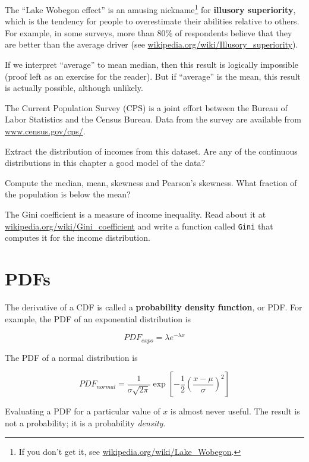 \documentclass[12pt]{book}
\begin{document}
\begin{ex}

The ``Lake Wobegon effect'' is an amusing nickname\footnote{If you
  don't get it, see \url{wikipedia.org/wiki/Lake_Wobegon}.} for {\bf
  illusory superiority}, which is the tendency for people to
overestimate their abilities relative to others.  For example, in some
surveys, more than 80\% of respondents believe that they are better
than the average driver (see
  \url{wikipedia.org/wiki/Illusory_superiority}).

If we interpret ``average'' to mean median, then this result is
logically impossible (proof left as an exercise for the reader).
But if ``average'' is the mean, this result is actually possible,
although unlikely. 

The Current Population Survey (CPS) is a joint effort between the
Bureau of Labor Statistics and the Census Bureau.  Data from the
survey are available from \url{www.census.gov/cps/}.

Extract the distribution of incomes from this dataset.  Are any of
the continuous distributions in this chapter a good model of
the data?

Compute the median, mean, skewness and Pearson's skewness.  What
fraction of the population is below the mean?

The Gini coefficient is a measure of income inequality.
Read about it at \url{wikipedia.org/wiki/Gini_coefficient} and write a
function called {\tt Gini} that computes it for the income
distribution.

\end{ex}


\section{PDFs}
\label{density}

The derivative of a CDF is called a {\bf probability density function},
or PDF.  For example, the PDF of an exponential distribution is

\[ PDF_{expo} = \lambda e^{-\lambda x}   \]

The PDF of a normal distribution is

\[ PDF_{normal} = \frac{1}{\sigma \sqrt{2 \pi}} 
                 \exp \left[ -\frac{1}{2} 
                 \left( \frac{x - \mu}{\sigma} \right)^2 \right]  \]

Evaluating a PDF for a particular value of $x$ is almost never useful.
The result is not a probability; it is a probability {\em density}.
\end{document}
